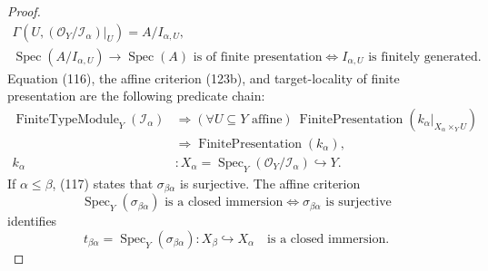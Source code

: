 \begin{proof}
  \[
  \begin{gathered}
    \Gamma\!\left(U,
      (\mathcal O_Y/\mathcal I_\alpha)|_U\right)=A/I_{\alpha,U},\\
    \operatorname{Spec}(A/I_{\alpha,U})\to\operatorname{Spec}(A)
      \text{ is of finite presentation}
      \Longleftrightarrow
    I_{\alpha,U}\text{ is finitely generated}.                  
  \end{gathered} \tag{123b}
  \]
  Equation (116), the affine criterion (123b), and target-locality of finite
  presentation are the following predicate chain:
  \[
  \begin{aligned}
    \operatorname{FiniteTypeModule}_Y(\mathcal I_\alpha)
      &\Longrightarrow
        (\forall U\subseteq Y\text{ affine})\ 
        \operatorname{FinitePresentation}
          (k_\alpha|_{X_\alpha\times_YU})\\
      &\Longrightarrow
        \operatorname{FinitePresentation}(k_\alpha),\\
    k_\alpha&\colon
      X_\alpha=\operatorname{Spec}_Y
        (\mathcal O_Y/\mathcal I_\alpha)\hookrightarrow Y.
  \end{aligned}                                                   \tag{124}
  \]
  If $\alpha\leq\beta$, (117) states that
  $\sigma_{\beta\alpha}$ is surjective.  The affine criterion
  \[
    \operatorname{Spec}_Y(\sigma_{\beta\alpha})
      \text{ is a closed immersion}
      \Longleftrightarrow
    \sigma_{\beta\alpha}\text{ is surjective}
  \]
  identifies
  \[
    t_{\beta\alpha}
      =\operatorname{Spec}_Y(\sigma_{\beta\alpha})\colon
        X_\beta\hookrightarrow X_\alpha
      \quad\text{is a closed immersion}.                       \tag{125}
  \]


\end{proof}
